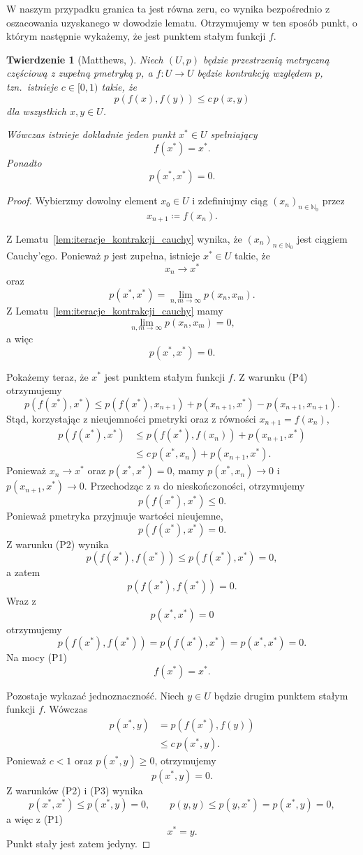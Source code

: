 \documentclass[11pt,a4paper]{article}
\theoremstyle{definition}
\theoremstyle{plain}
\newtheorem{twierdzenie}[definicja]{Twierdzenie}
\begin{document}
W naszym przypadku granica ta jest równa zeru, co wynika bezpośrednio
z oszacowania uzyskanego w dowodzie lematu. Otrzymujemy w ten sposób
punkt, o którym następnie wykażemy, że jest punktem stałym funkcji
$f$.

\begin{twierdzenie}[Matthews, \cite{matthews1994}]
	\label{tw:punkt_staly_matthews}
	Niech $(U,p)$ będzie przestrzenią metryczną częściową z zupełną pmetryką $p$, a
	$f:U\to U$ będzie kontrakcją względem $p$, tzn.\ istnieje
	$c\in[0,1)$ takie, że
	\[
	p(f(x),f(y))\leq c\,p(x,y)
	\]
	dla wszystkich $x,y\in U$.
	
	Wówczas istnieje dokładnie jeden punkt $x^*\in U$ spełniający
	\[
	f(x^*)=x^*.
	\]
	Ponadto
	\[
	p(x^*,x^*)=0.
	\]
\end{twierdzenie}

\begin{proof}
	Wybierzmy dowolny element $x_0\in U$ i zdefiniujmy ciąg
	$(x_n)_{n\in\mathbb N_0}$ przez
	\[
	x_{n+1}\coloneqq f(x_n).
	\]
	
	Z Lematu~\ref{lem:iteracje_kontrakcji_cauchy} wynika, że
	$(x_n)_{n\in\mathbb N_0}$ jest ciągiem Cauchy'ego. Ponieważ $p$ jest
	zupełna, istnieje $x^*\in U$ takie, że
	\[
	x_n\longrightarrow x^*
	\]
	oraz
	\[
	p(x^*,x^*)
	=
	\lim_{n,m\to\infty}p(x_n,x_m).
	\]
	Z Lematu~\ref{lem:iteracje_kontrakcji_cauchy} mamy
	\[
	\lim_{n,m\to\infty}p(x_n,x_m)=0,
	\]
	a więc
	\[
	p(x^*,x^*)=0.
	\]
	
	Pokażemy teraz, że $x^*$ jest punktem stałym funkcji $f$. Z warunku
	(P4) otrzymujemy
	\[
	p(f(x^*),x^*)
	\leq
	p(f(x^*),x_{n+1})
	+
	p(x_{n+1},x^*)
	-
	p(x_{n+1},x_{n+1}).
	\]
	Stąd, korzystając z nieujemności pmetryki oraz z równości
	$x_{n+1}=f(x_n)$,
	\[
	\begin{aligned}
		p(f(x^*),x^*)
		&\leq
		p(f(x^*),f(x_n))+p(x_{n+1},x^*)\\
		&\leq
		c\,p(x^*,x_n)+p(x_{n+1},x^*).
	\end{aligned}
	\]
	Ponieważ $x_n\to x^*$ oraz $p(x^*,x^*)=0$, mamy
	$p(x^*,x_n)\to0$ i $p(x_{n+1},x^*)\to0$. Przechodząc z $n$ do
	nieskończoności, otrzymujemy
	\[
	p(f(x^*),x^*)\leq 0.
	\]
	Ponieważ pmetryka przyjmuje wartości nieujemne,
	\[
	p(f(x^*),x^*)=0.
	\]
	Z warunku (P2) wynika
	\[
	p(f(x^*),f(x^*))\leq p(f(x^*),x^*)=0,
	\]
	a zatem
	\[
	p(f(x^*),f(x^*))=0.
	\]
	Wraz z
	\[
	p(x^*,x^*)=0
	\]
	otrzymujemy
	\[
	p(f(x^*),f(x^*))
	=
	p(f(x^*),x^*)
	=
	p(x^*,x^*)
	=
	0.
	\]
	Na mocy (P1)
	\[
	f(x^*)=x^*.
	\]
	
	Pozostaje wykazać jednoznaczność. Niech $y\in U$ będzie drugim
	punktem stałym funkcji $f$. Wówczas
	\[
	\begin{aligned}
		p(x^*,y)
		&=
		p(f(x^*),f(y))\\
		&\leq
		c\,p(x^*,y).
	\end{aligned}
	\]
	Ponieważ $c<1$ oraz $p(x^*,y)\geq0$, otrzymujemy
	\[
	p(x^*,y)=0.
	\]
	Z warunków (P2) i (P3) wynika
	\[
	p(x^*,x^*)\leq p(x^*,y)=0,
	\qquad
	p(y,y)\leq p(y,x^*)=p(x^*,y)=0,
	\]
	a więc z (P1)
	\[
	x^*=y.
	\]
	Punkt stały jest zatem jedyny.
\end{proof}
\end{document}
